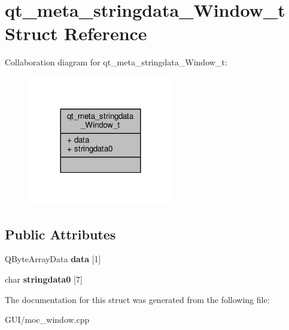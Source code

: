 \hypertarget{structqt__meta__stringdata__Window__t}{}\section{qt\+\_\+meta\+\_\+stringdata\+\_\+\+Window\+\_\+t Struct Reference}
\label{structqt__meta__stringdata__Window__t}


Collaboration diagram for qt\+\_\+meta\+\_\+stringdata\+\_\+\+Window\+\_\+t\+:
\nopagebreak
\begin{figure}[H]
\begin{center}
\leavevmode
\includegraphics[width=180pt]{structqt__meta__stringdata__Window__t__coll__graph}
\end{center}
\end{figure}
\subsection*{Public Attributes}
\begin{DoxyCompactItemize}
\item 
\mbox{\label{structqt__meta__stringdata__Window__t_ab091aa5a4766cbce761abf42a7aa79ab}} 
Q\+Byte\+Array\+Data {\bfseries data} \mbox{[}1\mbox{]}
\item 
\mbox{\label{structqt__meta__stringdata__Window__t_a768469695521a8ce4b99abc74ffe8c10}} 
char {\bfseries stringdata0} \mbox{[}7\mbox{]}
\end{DoxyCompactItemize}


The documentation for this struct was generated from the following file\+:\begin{DoxyCompactItemize}
\item 
G\+U\+I/moc\+\_\+window.\+cpp\end{DoxyCompactItemize}
